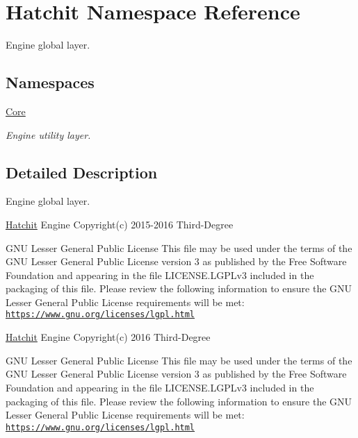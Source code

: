 \hypertarget{namespaceHatchit}{}\section{Hatchit Namespace Reference}
\label{namespaceHatchit}


Engine global layer.  


\subsection*{Namespaces}
\begin{DoxyCompactItemize}
\item 
 \hyperlink{namespaceHatchit_1_1Core}{Core}
\begin{DoxyCompactList}\small\item\em Engine utility layer. \end{DoxyCompactList}\end{DoxyCompactItemize}


\subsection{Detailed Description}
Engine global layer. 

\hyperlink{namespaceHatchit}{Hatchit} Engine Copyright(c) 2015-\/2016 Third-\/\+Degree

G\+NU Lesser General Public License This file may be used under the terms of the G\+NU Lesser General Public License version 3 as published by the Free Software Foundation and appearing in the file L\+I\+C\+E\+N\+S\+E.\+L\+G\+P\+Lv3 included in the packaging of this file. Please review the following information to ensure the G\+NU Lesser General Public License requirements will be met\+: \href{https://www.gnu.org/licenses/lgpl.html}{\tt https\+://www.\+gnu.\+org/licenses/lgpl.\+html}

\hyperlink{namespaceHatchit}{Hatchit} Engine Copyright(c) 2016 Third-\/\+Degree

G\+NU Lesser General Public License This file may be used under the terms of the G\+NU Lesser General Public License version 3 as published by the Free Software Foundation and appearing in the file L\+I\+C\+E\+N\+S\+E.\+L\+G\+P\+Lv3 included in the packaging of this file. Please review the following information to ensure the G\+NU Lesser General Public License requirements will be met\+: \href{https://www.gnu.org/licenses/lgpl.html}{\tt https\+://www.\+gnu.\+org/licenses/lgpl.\+html} 